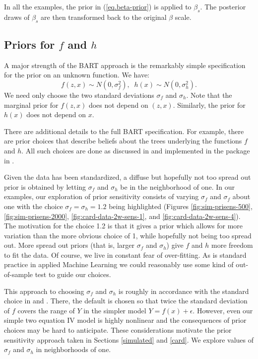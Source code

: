 In all the examples, the prior in (\ref{eq.beta-prior}) is applied to $\beta_s$.
The posterior draws of $\beta_s$ are then transformed back to the original $\beta$ scale.

\subsection{Priors for $f$ and $h$}\label{subsec:fh-prior}


A major strength of the BART approach is the remarkably simple specification for the prior on an unknown 
function.  We have:
\begin{equation}
f(z,x) \sim N(0,\sigma_f^2), \;\; h(x) \sim N(0,\sigma_h^2).
\end{equation}
We need only choose the two standard deviations $\sigma_f$ and $\sigma_h$.
Note that the marginal prior for $f(z,x)$ does not depend on $(z,x)$.  Similarly, the prior
for $h(x)$ does not depend on $x$.

There are additional details to the full BART specification.
For example, there are prior choices that describe beliefs about the trees underlying 
the functions $f$ and $h$.  All such choices are done as discussed in \citep{ChipGeor10} and
implemented in the package \citep{BARTRP} in \citep{RENV}.

Given the data has been standardized, a diffuse but hopefully not too spread out prior is obtained
by letting $\sigma_f$ and $\sigma_h$ be in the neighborhood of one.
In our examples, our exploration of prior sensitivity consists of varying $\sigma_f$ and $\sigma_f$ about one
with the choice $\sigma_f = \sigma_h = 1.2$ being highlighted 
(Figures \ref{fig:sim-prisens-500}, \ref{fig:sim-prisens-2000}, \ref{fig:card-data-2w-sens-1}, and \ref{fig:card-data-2w-sens-4}).
The motivation for the choice 1.2 is that it gives a prior which allows for more variation than the more obvious choice of 1, 
while hopefully not being too spread out.
More spread out priors (that is, larger $\sigma_f$ and $\sigma_h$) give $f$ and $h$ more freedom to fit the data.
Of course, we live in constant fear of over-fitting.
As is standard practice in applied Machine Learning we could reasonably use some kind of out-of-sample test
to guide our choices.


This approach to choosing $\sigma_f$ and $\sigma_h$ 
is roughly in accordance with the standard choice in \citep{ChipGeor10} and \citep{BARTRP}.
There, the default is chosen so that twice the standard deviation of $f$ covers the range of $Y$ in the simpler
model $Y = f(x) + \epsilon$.
However, even our simple two equation IV model is highly nonlinear and the consequences of prior choices
may be hard to anticipate.  These considerations motivate the prior sensitivity approach taken in 
Sections \ref{simulated} and \ref{card}.
We explore values of $\sigma_f$ and $\sigma_h$ in neighborhoods of one.


